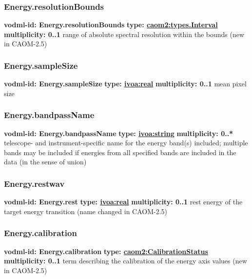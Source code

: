     \subsubsection{Energy.resolutionBounds}
      \textbf{vodml-id: Energy.resolutionBounds} \newline
      \textbf{type: \hyperref[sect:types.Interval]{caom2:types.Interval}} \newline
      \textbf{multiplicity: 0..1} \newline
      range of absolute spectral resolution within the bounds (new in CAOM-2.5)

    \subsubsection{Energy.sampleSize}
      \textbf{vodml-id: Energy.sampleSize} \newline
      \textbf{type: \hyperref[sect:ivoa]{ivoa:real}} \newline
      \textbf{multiplicity: 0..1} \newline
      mean pixel size

    \subsubsection{Energy.bandpassName}
      \textbf{vodml-id: Energy.bandpassName} \newline
      \textbf{type: \hyperref[sect:ivoa]{ivoa:string}} \newline
      \textbf{multiplicity: 0..*} \newline
      telescope- and instrument-specific name for the energy band(s) included; multiple bands may be included if energies from all specified bands are included in the data (in the sense of union)

    \subsubsection{Energy.restwav}
      \textbf{vodml-id: Energy.rest} \newline
      \textbf{type: \hyperref[sect:ivoa]{ivoa:real}} \newline
      \textbf{multiplicity: 0..1} \newline
      rest energy of the target energy transition (name changed in CAOM-2.5)

    \subsubsection{Energy.calibration}
      \textbf{vodml-id: Energy.calibration} \newline
      \textbf{type: \hyperref[sect:CalibrationStatus]{caom2:CalibrationStatus}} \newline
      \textbf{multiplicity: 0..1} \newline
      term describing the calibration of the energy axis values (new in CAOM-2.5)

